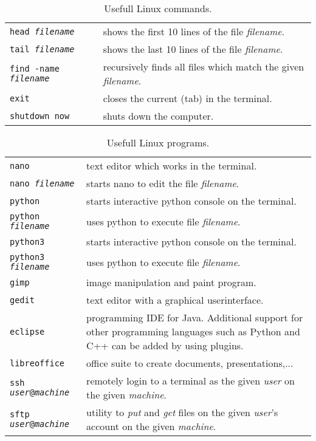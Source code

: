 \documentclass[11pt,a4paper]{article}
\begin{document}
\begin{table}[!ht]
\begin{tabular}{p{4.4cm}p{10.3cm}}
		\texttt{head \emph{filename}} & shows the first 10 lines of the file \emph{filename}.\\
		\texttt{tail \emph{filename}} & shows the last 10 lines of the file \emph{filename}.\\
		\midrule
		\texttt{find -name \emph{filename}} & recursively finds all files which match the given \emph{filename}.\\
		\midrule
		\texttt{exit} & closes the current (tab) in the terminal.\\
		\texttt{shutdown now} & shuts down the computer.\\
		\bottomrule[1pt]
	\end{tabular}
	\caption{Usefull Linux commands.}
\end{table}

\begin{table}[!ht]
	\centering
	\begin{tabular}{p{4.4cm}p{10.3cm}}
		\toprule[1pt]
		\texttt{nano} & text editor which works in the terminal.\\
		\texttt{nano \emph{filename}} & starts nano to edit the file \emph{filename}.\\
		\midrule
		\texttt{python} & starts interactive python console on the terminal.\\
		\texttt{python \emph{filename}} & uses python to execute file \emph{filename}.\\
		\texttt{python3} & starts interactive python console on the terminal.\\
		\texttt{python3 \emph{filename}} & uses python to execute file \emph{filename}.\\
		\midrule
		\texttt{gimp} & image manipulation and paint program.\\
		\texttt{gedit} & text editor with a graphical userinterface.\\
		\texttt{eclipse} & programming IDE for Java. Additional support for other programming languages such as Python and C++ can be added by using plugins.\\
		\texttt{libreoffice} & office suite to create documents, presentations,...\\
		\midrule
		\texttt{ssh \emph{user}@\emph{machine}} & remotely login to a terminal as the given \emph{user} on the given \emph{machine}.\\
		\texttt{sftp \emph{user}@\emph{machine}} & utility to \emph{put} and \emph{get} files on the given \emph{user}'s account on the given \emph{machine}.\\
		\bottomrule[1pt]
	\end{tabular}
	\caption{Usefull Linux programs.}
\end{table}
\end{document}
